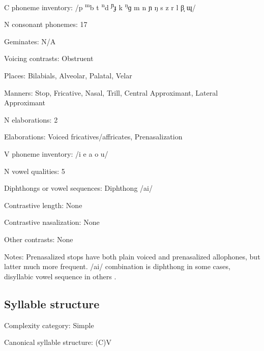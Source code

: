 {\begin{appendixdesc}
\item[C phoneme inventory:] /p \textsuperscript{m}b t \textsuperscript{n}d \textsuperscript{ɲ}ɟ k \textsuperscript{ŋ}ɡ m n ɲ ŋ s z r l β̞ ɰ/

\item[N consonant phonemes:] 17

\item[Geminates:] N/A

\item[Voicing contrasts:] Obstruent

\item[Places:] Bilabials, Alveolar, Palatal, Velar

\item[Manners:] Stop, Fricative, Nasal, Trill, Central Approximant, Lateral Approximant

\item[N elaborations:] 2

\item[Elaborations:] Voiced fricatives/affricates, Prenasalization

\item[V phoneme inventory:] /i e a o u/

\item[N vowel qualities:] 5

\item[Diphthongs or vowel sequences:] Diphthong /ai/

\item[Contrastive length:] None

\item[Contrastive nasalization:] None

\item[Other contrasts:] None

\item[Notes:] Prenasalized stops have both plain voiced and prenasalized allophones, but latter much more frequent. /ai/ combination is diphthong in some cases, disyllabic vowel sequence in others \citep[22]{Wegener2008}.
\end{appendixdesc}
\subsection*{Syllable structure}
\begin{appendixdesc}

\item[Complexity category:] Simple

\item[Canonical syllable structure:] (C)V \citep[23--24]{Wegener2008}


\end{appendixdesc}}
